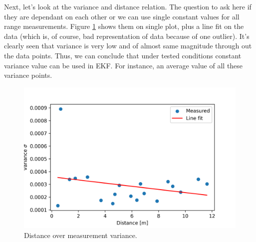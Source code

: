 Next, let's look at the variance and distance relation. The question to ask here if they are dependant on each other or we can use single constant values for all range measurements. Figure \ref{fig:distance_var} shows them on single plot, plus a line fit on the data (which is, of course, bad representation of data because of one outlier). It's clearly seen that variance is very low and of almost same magnitude through out the data points. Thus, we can conclude that under tested conditions constant variance value can be used in EKF. For instance, an average value of all these variance points.
\begin{figure}[H]
    \centering
    \includegraphics[width=\linewidth]{figures/dist_variance.png}
    \caption{Distance over measurement variance.}
    \label{fig:distance_var}
\end{figure}


